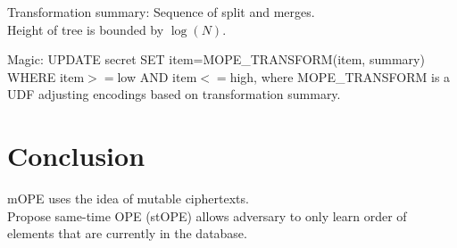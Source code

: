 \documentclass[10pt]{article}
\begin{document}
Transformation summary: Sequence of split and merges.\\

Height of tree is bounded by $\log(N)$.

Magic: UPDATE secret SET item=MOPE\_TRANSFORM(item, summary) WHERE item$>=$low AND item$<=$high, where MOPE\_TRANSFORM is a UDF adjusting encodings based on transformation summary.\\



\section{Conclusion}

mOPE uses the idea of mutable ciphertexts.\\
Propose same-time OPE (stOPE) allows adversary to only learn order of elements that are currently in the database.
\end{document}
